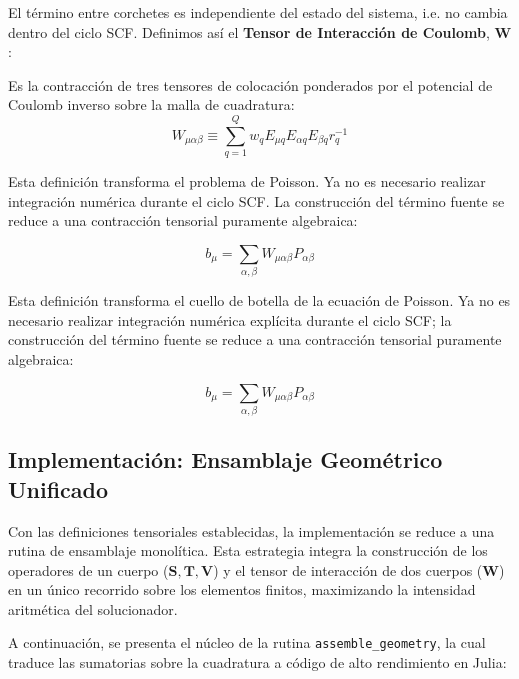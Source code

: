 \documentclass[12pt, a4paper, oneside, spanish]{article}
\begin{document}
El término entre corchetes es independiente del estado del sistema, i.e. no cambia dentro del ciclo SCF. Definimos así el \textbf{Tensor de Interacción de Coulomb}, \( \mathbf{W} \):

\begin{definition}
Es la contracción de tres tensores de colocación ponderados por el potencial de Coulomb inverso sobre la malla de cuadratura:
\begin{equation}
W_{\mu \alpha \beta} \equiv \sum_{q=1}^Q w_q E_{\mu q} E_{\alpha q} E_{\beta q} r_q^{-1}
\end{equation}
\end{definition}

Esta definición transforma el problema de Poisson. Ya no es necesario realizar integración numérica durante el ciclo SCF. La construcción del término fuente se reduce a una contracción tensorial puramente algebraica:

\begin{equation}
b_\mu = \sum_{\alpha, \beta} W_{\mu \alpha \beta} P_{\alpha \beta}
\end{equation}


Esta definición transforma el cuello de botella de la ecuación de Poisson. Ya no es necesario realizar integración numérica explícita durante el ciclo SCF; la construcción del término fuente se reduce a una contracción tensorial puramente algebraica:

\begin{equation}
b_\mu = \sum_{\alpha, \beta} W_{\mu \alpha \beta} P_{\alpha \beta}
\end{equation}

\subsection{Implementación: Ensamblaje Geométrico Unificado}

Con las definiciones tensoriales establecidas, la implementación se reduce a una rutina de ensamblaje monolítica. Esta estrategia integra la construcción de los operadores de un cuerpo (\(\mathbf{S}, \mathbf{T}, \mathbf{V}\)) y el tensor de interacción de dos cuerpos (\(\mathbf{W}\)) en un único recorrido sobre los elementos finitos, maximizando la intensidad aritmética del solucionador.

A continuación, se presenta el núcleo de la rutina \texttt{assemble\_geometry}, la cual traduce las sumatorias sobre la cuadratura a código de alto rendimiento en Julia:
\end{document}
